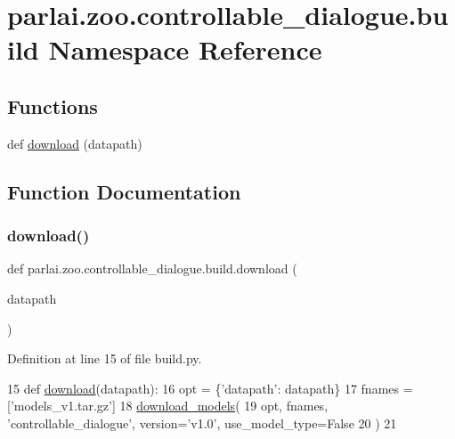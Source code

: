 \hypertarget{namespaceparlai_1_1zoo_1_1controllable__dialogue_1_1build}{}\section{parlai.\+zoo.\+controllable\+\_\+dialogue.\+build Namespace Reference}
\label{namespaceparlai_1_1zoo_1_1controllable__dialogue_1_1build}
\subsection*{Functions}
\begin{DoxyCompactItemize}
\item 
def \hyperlink{namespaceparlai_1_1zoo_1_1controllable__dialogue_1_1build_aa83ad8d48bada73bf7e1c6c5fa4a2f77}{download} (datapath)
\end{DoxyCompactItemize}


\subsection{Function Documentation}
\mbox{\label{namespaceparlai_1_1zoo_1_1controllable__dialogue_1_1build_aa83ad8d48bada73bf7e1c6c5fa4a2f77}} 
\subsubsection{\texorpdfstring{download()}{download()}}
{\footnotesize\ttfamily def parlai.\+zoo.\+controllable\+\_\+dialogue.\+build.\+download (\begin{DoxyParamCaption}\item[{}]{datapath }\end{DoxyParamCaption})}



Definition at line 15 of file build.\+py.


\begin{DoxyCode}
15 \textcolor{keyword}{def }\hyperlink{namespaceparlai_1_1zoo_1_1pretrained__transformers_1_1build_afaead0deab400e1c516706e85dd4ed9b}{download}(datapath):
16     opt = \{\textcolor{stringliteral}{'datapath'}: datapath\}
17     fnames = [\textcolor{stringliteral}{'models\_v1.tar.gz'}]
18     \hyperlink{namespaceparlai_1_1core_1_1build__data_ab697f23f05d3e36d7979fe5e0ed7911e}{download\_models}(
19         opt, fnames, \textcolor{stringliteral}{'controllable\_dialogue'}, version=\textcolor{stringliteral}{'v1.0'}, use\_model\_type=\textcolor{keyword}{False}
20     )
21 \end{DoxyCode}
